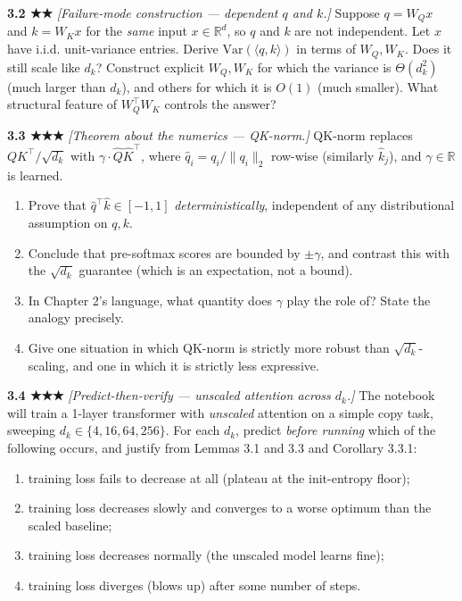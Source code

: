 \documentclass[
]{article}
\providecommand{\tightlist}{%
  \setlength{\itemsep}{0pt}\setlength{\parskip}{0pt}}
\begin{document}
\textbf{3.2 ★★} \emph{{[}Failure-mode construction --- dependent \(q\)
and \(k\).{]}} Suppose \(q = W_Q x\) and \(k = W_K x\) for the
\emph{same} input \(x \in \mathbb{R}^d\), so \(q\) and \(k\) are not
independent. Let \(x\) have i.i.d. unit-variance entries. Derive
\(\text{Var}(\langle q, k \rangle)\) in terms of \(W_Q, W_K\). Does it
still scale like \(d_k\)? Construct explicit \(W_Q, W_K\) for which the
variance is \(\Theta(d_k^2)\) (much larger than \(d_k\)), and others for
which it is \(O(1)\) (much smaller). What structural feature of
\(W_Q^\top W_K\) controls the answer?

\textbf{3.3 ★★★} \emph{{[}Theorem about the numerics --- QK-norm.{]}}
QK-norm replaces \(QK^\top / \sqrt{d_k}\) with
\(\gamma \cdot \hat Q \hat K^\top\), where
\(\hat q_i = q_i / \|q_i\|_2\) row-wise (similarly \(\hat k_j\)), and
\(\gamma \in \mathbb{R}\) is learned.

\begin{enumerate}
\def\labelenumi{(\alph{enumi})}
\tightlist
\item
  Prove that \(\hat q^\top \hat k \in [-1, 1]\)
  \emph{deterministically}, independent of any distributional assumption
  on \(q, k\).
\item
  Conclude that pre-softmax scores are bounded by \(\pm \gamma\), and
  contrast this with the \(\sqrt{d_k}\) guarantee (which is an
  expectation, not a bound).
\item
  In Chapter 2's language, what quantity does \(\gamma\) play the role
  of? State the analogy precisely.
\item
  Give one situation in which QK-norm is strictly more robust than
  \(\sqrt{d_k}\)-scaling, and one in which it is strictly less
  expressive.
\end{enumerate}

\textbf{3.4 ★★★} \emph{{[}Predict-then-verify --- unscaled attention
across \(d_k\).{]}} The notebook will train a 1-layer transformer with
\emph{unscaled} attention on a simple copy task, sweeping
\(d_k \in \{4, 16, 64, 256\}\). For each \(d_k\), predict \emph{before
running} which of the following occurs, and justify from Lemmas 3.1 and
3.3 and Corollary 3.3.1:

\begin{enumerate}
\def\labelenumi{(\alph{enumi})}
\tightlist
\item
  training loss fails to decrease at all (plateau at the init-entropy
  floor);
\item
  training loss decreases slowly and converges to a worse optimum than
  the scaled baseline;
\item
  training loss decreases normally (the unscaled model learns fine);
\item
  training loss diverges (blows up) after some number of steps.
\end{enumerate}
\end{document}
